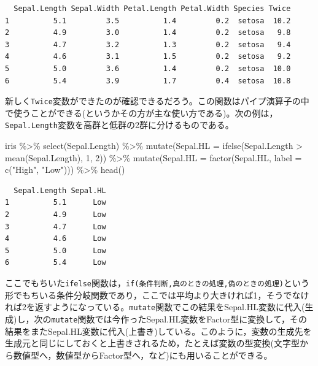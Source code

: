 \documentclass[
  a4paper,
]{ltjsbook}
\newenvironment{Shaded}{\begin{snugshade}}{\end{snugshade}}
\newcommand{\AttributeTok}[1]{\textcolor[rgb]{0.40,0.45,0.13}{#1}}
\newcommand{\DecValTok}[1]{\textcolor[rgb]{0.68,0.00,0.00}{#1}}
\newcommand{\FunctionTok}[1]{\textcolor[rgb]{0.28,0.35,0.67}{#1}}
\newcommand{\NormalTok}[1]{\textcolor[rgb]{0.00,0.23,0.31}{#1}}
\newcommand{\SpecialCharTok}[1]{\textcolor[rgb]{0.37,0.37,0.37}{#1}}
\newcommand{\StringTok}[1]{\textcolor[rgb]{0.13,0.47,0.30}{#1}}
\begin{document}
\begin{verbatim}
  Sepal.Length Sepal.Width Petal.Length Petal.Width Species Twice
1          5.1         3.5          1.4         0.2  setosa  10.2
2          4.9         3.0          1.4         0.2  setosa   9.8
3          4.7         3.2          1.3         0.2  setosa   9.4
4          4.6         3.1          1.5         0.2  setosa   9.2
5          5.0         3.6          1.4         0.2  setosa  10.0
6          5.4         3.9          1.7         0.4  setosa  10.8
\end{verbatim}

新しく\texttt{Twice}変数ができたのが確認できるだろう。この関数はパイプ演算子の中で使うことができる(というかその方が主な使い方である)。次の例は，\texttt{Sepal.Length}変数を高群と低群の2群に分けるものである。

\begin{Shaded}
\begin{Highlighting}[]
\NormalTok{iris }\SpecialCharTok{\%\textgreater{}\%}
  \FunctionTok{select}\NormalTok{(Sepal.Length) }\SpecialCharTok{\%\textgreater{}\%}
  \FunctionTok{mutate}\NormalTok{(}\AttributeTok{Sepal.HL =} \FunctionTok{ifelse}\NormalTok{(Sepal.Length }\SpecialCharTok{\textgreater{}} \FunctionTok{mean}\NormalTok{(Sepal.Length), }\DecValTok{1}\NormalTok{, }\DecValTok{2}\NormalTok{)) }\SpecialCharTok{\%\textgreater{}\%}
  \FunctionTok{mutate}\NormalTok{(}\AttributeTok{Sepal.HL =} \FunctionTok{factor}\NormalTok{(Sepal.HL, }\AttributeTok{label =} \FunctionTok{c}\NormalTok{(}\StringTok{"High"}\NormalTok{, }\StringTok{"Low"}\NormalTok{))) }\SpecialCharTok{\%\textgreater{}\%}
  \FunctionTok{head}\NormalTok{()}
\end{Highlighting}
\end{Shaded}

\begin{verbatim}
  Sepal.Length Sepal.HL
1          5.1      Low
2          4.9      Low
3          4.7      Low
4          4.6      Low
5          5.0      Low
6          5.4      Low
\end{verbatim}

ここでもちいた\texttt{ifelse}関数は，\texttt{if(条件判断,真のときの処理,偽のときの処理)}という形でもちいる条件分岐関数であり，ここでは平均より大きければ1，そうでなければ2を返すようになっている。\texttt{mutate}関数でこの結果をSepal.HL変数に代入(生成)し，次の\texttt{mutate}関数では今作ったSepal.HL変数をFactor型に変換して，その結果をまたSepal.HL変数に代入(上書き)している。このように，変数の生成先を生成元と同じにしておくと上書きされるため，たとえば変数の型変換(文字型から数値型へ，数値型からFactor型へ，など)にも用いることができる。
\end{document}
